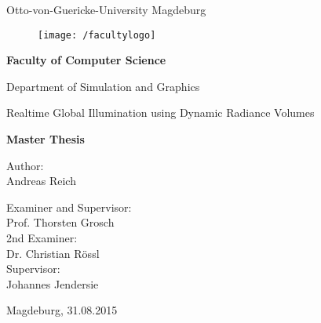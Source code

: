 \documentclass[thesis.tex]{subfiles}
\begin{document}
\thispagestyle {empty}

\begin{center}
\begin{Large}
Otto-von-Guericke-University Magdeburg\\

\begin{figure}
	\centering
	\texttt{[image: /facultylogo]}
	\label{fig:logoinffak}
\end{figure}

\vspace{3mm}

\textbf{Faculty of Computer Science}\\
\end{Large}

\vspace{3mm}

Department of Simulation and Graphics\\

\vspace{1cm}
\begin{LARGE}
Realtime Global Illumination using Dynamic Radiance Volumes\\
\end{LARGE}
\vspace{15mm}
{\Huge \textbf{Master Thesis}}\\
\vspace{15mm}

Author:\\
\vspace{4mm}
{\huge Andreas Reich}\\

\vspace{14mm}

Examiner and Supervisor:\\
\vspace{2mm}
{\Large Prof. Thorsten Grosch}\\
\vspace{4mm}
2nd Examiner:\\
\vspace{2mm}
{\Large Dr. Christian Rössl}\\
\vspace{8mm}
Supervisor:\\
\vspace{2mm}
{\Large Johannes Jendersie}\\


\vspace{20mm}

{\large Magdeburg, 31.08.2015}\\

\vspace{40mm}

\end{center}
\clearpage
\end{document}
